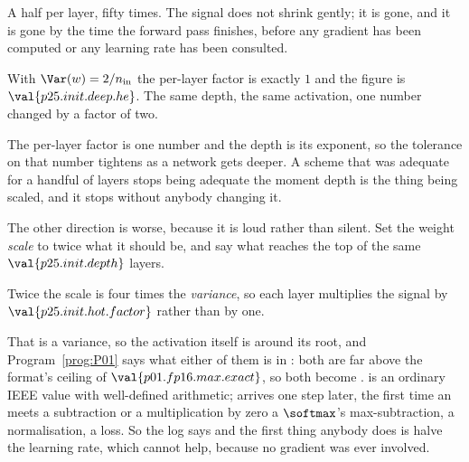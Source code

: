 \begin{fr}

A half per layer, fifty times. The signal does not shrink gently; it is gone,
and it is gone by the time the forward pass finishes, before any gradient has
been computed or any learning rate has been consulted.

With $\Var(w) = 2/n_{\text{in}}$ the per-layer factor is exactly $1$ and the
figure is $\val{p25.init.deep.he}$. The same depth, the same activation, one
number changed by a factor of two.
\end{fr}

\begin{fr}

The per-layer factor is one number and the depth is its exponent, so the
tolerance on that number tightens as a network gets deeper. A scheme that was
adequate for a handful of layers stops being adequate the moment depth is the
thing being scaled, and it stops without anybody changing it.

The other direction is worse, because it is loud rather than silent. Set the
weight \emph{scale} to twice what it should be, and say what reaches the top
of the same $\val{p25.init.depth}$ layers.
\dotline
\nextframe
\end{fr}

\begin{fr}

Twice the scale is four times the \emph{variance}, so each layer multiplies
the signal by $\val{p25.init.hot.factor}$ rather than by one.

That is a variance, so the activation itself is around its root, and
Program~\ref{prog:P01} says what either of them is in : both are
far above the format's ceiling of $\val{p01.fp16.max.exact}$, so both become
.  is an ordinary IEEE value with well-defined arithmetic;
 arrives one step later, the first time an  meets a
subtraction or a multiplication by zero \dash{} a $\softmax$'s max-subtraction,
a normalisation, a loss. So the log says  and the first thing
anybody does is halve the learning rate, which cannot help, because no
gradient was ever involved.
\end{fr}

